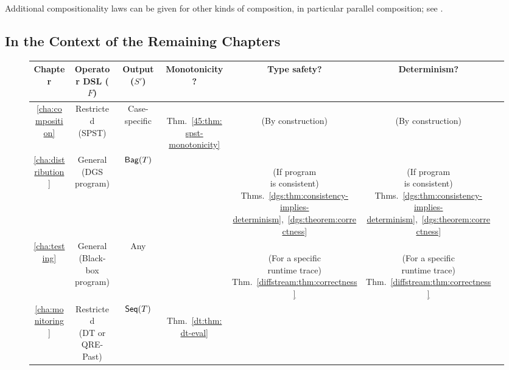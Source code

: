 Additional compositionality laws can be given for other kinds of composition, in particular parallel composition; see .

\subsection{In the Context of the Remaining Chapters}

\begin{figure}[t]
\centering
\small
\renewcommand{\arraystretch}{5}
\setlength{\tabcolsep}{4pt}
\begin{tabular}{ccccccc}
Chapter & Operator DSL ($F$) & Output ($S'$) & Monotonicity? & Type safety? & Determinism? \\
\hline
\ref{cha:composition}
  & \makecell{Restricted \\ (SPST)} & Case-specific
  & \makecell{\Yes{} \\ Thm.~\ref{45:thm:spst-monotonicity}} & \makecell{\Yes{} \\ (By construction)} & \makecell{\Yes{} \\ (By construction)} \\
\ref{cha:distribution}
  & \makecell{General \\ (DGS program)} & $\mathsf{Bag}({T})$
  & \Yes{} & \makecell{\Yes{} \\ (If program \\ is consistent) \\ Thms.~\ref{dgs:thm:consistency-implies-determinism},~\ref{dgs:theorem:correctness}} & \makecell{\Yes{} \\ (If program \\ is consistent) \\ Thms.~\ref{dgs:thm:consistency-implies-determinism},~\ref{dgs:theorem:correctness}} \\
\ref{cha:testing}
  & \makecell{General \\ (Black-box program)} & Any
  & \Yes{} & \makecell{\Partial{} \\ (For a specific \\ runtime trace) \\ Thm.~\ref{diffstream:thm:correctness}} & \makecell{\Partial{} \\ (For a specific \\ runtime trace) \\ Thm.~\ref{diffstream:thm:correctness}} \\
\ref{cha:monitoring}
  & \makecell{Restricted \\ (DT or QRE-Past)} & $\mathsf{Seq}({T})$
  & \makecell{\Yes{} \\ Thm.~\ref{dt:thm:dt-eval}} & \NA{} & \Yes{} \\
\end{tabular}


\end{figure}
